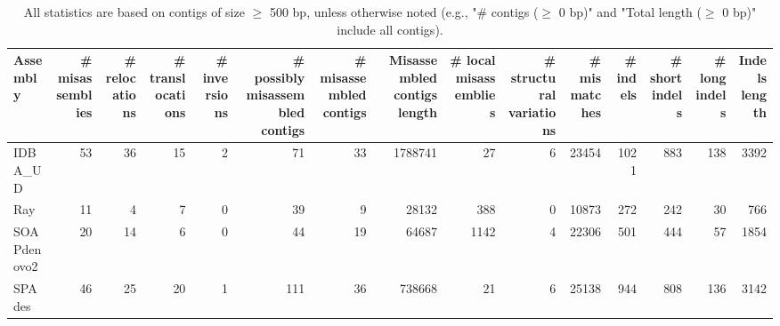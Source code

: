 \documentclass[12pt,a4paper]{article}
\begin{document}
\begin{table}[ht]
\begin{center}
\caption{All statistics are based on contigs of size $\geq$ 500 bp, unless otherwise noted (e.g., "\# contigs ($\geq$ 0 bp)" and "Total length ($\geq$ 0 bp)" include all contigs).}
\begin{tabular}{|l*{14}{|r}|}
\hline
Assembly & \# misassemblies &     \# relocations &     \# translocations &     \# inversions & \# possibly misassembled contigs & \# misassembled contigs & Misassembled contigs length & \# local misassemblies & \# structural variations & \# mismatches & \# indels &     \# short indels &     \# long indels & Indels length \\ \hline
IDBA\_UD & 53 & 36 & 15 & 2 & 71 & 33 & 1788741 & 27 & 6 & 23454 & 1021 & 883 & 138 & 3392 \\ \hline
Ray & 11 & 4 & 7 & 0 & 39 & 9 & 28132 & 388 & 0 & 10873 & 272 & 242 & 30 & 766 \\ \hline
SOAPdenovo2 & 20 & 14 & 6 & 0 & 44 & 19 & 64687 & 1142 & 4 & 22306 & 501 & 444 & 57 & 1854 \\ \hline
SPAdes & 46 & 25 & 20 & 1 & 111 & 36 & 738668 & 21 & 6 & 25138 & 944 & 808 & 136 & 3142 \\ \hline
\end{tabular}
\end{center}
\end{table}
\end{document}
